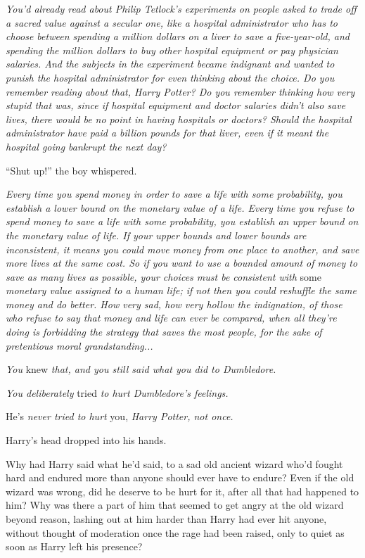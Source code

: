 \emph{You'd already read about Philip Tetlock's experiments on people
asked to trade off a sacred value against a secular one, like a hospital
administrator who has to choose between spending a million dollars on a
liver to save a five-year-old, and spending the million dollars to buy
other hospital equipment or pay physician salaries. And the subjects in
the experiment became indignant and wanted to punish the hospital
administrator for even thinking about the choice. Do you remember
reading about that, Harry Potter? Do you remember thinking how very
stupid that was, since if hospital equipment and doctor salaries didn't
also save lives, there would be no point in having hospitals or doctors?
Should the hospital administrator have paid a billion pounds for that
liver, even if it meant the hospital going bankrupt the next day?}

``Shut up!'' the boy whispered.

\emph{Every time you spend money in order to save a life with some
probability, you establish a lower bound on the monetary value of a
life. Every time you refuse to spend money to save a life with some
probability, you establish an upper bound on the monetary value of life.
If your upper bounds and lower bounds are inconsistent, it means you
could move money from one place to another, and save more lives at the
same cost. So if you want to use a bounded amount of money to save as
many lives as possible, your choices must be consistent with} some
\emph{monetary value assigned to a human life; if not then you could
reshuffle the same money and do better. How very sad, how very hollow
the indignation, of those who refuse to say that money and life can ever
be compared, when all they're doing is forbidding the strategy that
saves the most people, for the sake of pretentious moral
grandstanding...}

\emph{You} knew \emph{that, and you still said what you did to
Dumbledore.}

\emph{You deliberately} tried \emph{to hurt Dumbledore's feelings.}

He's \emph{never tried to hurt} you, \emph{Harry Potter, not once.}

Harry's head dropped into his hands.

Why had Harry said what he'd said, to a sad old ancient wizard who'd
fought hard and endured more than anyone should ever have to endure?
Even if the old wizard was wrong, did he deserve to be hurt for it,
after all that had happened to him? Why was there a part of him that
seemed to get angry at the old wizard beyond reason, lashing out at him
harder than Harry had ever hit anyone, without thought of moderation
once the rage had been raised, only to quiet as soon as Harry left his
presence?

